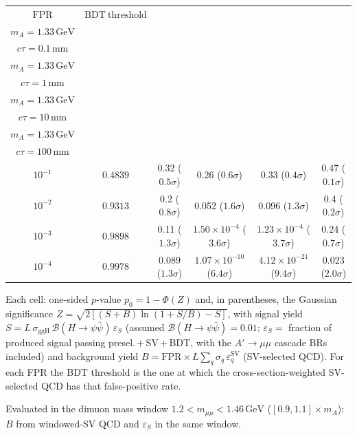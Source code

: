 \documentclass[10pt,a4paper]{article}
\begin{document}
{\begin{tabular}{cccccc}
\toprule
$\mathrm{FPR}$ & $\mathrm{BDT\ threshold}$ & \shortstack{$m_{\pi}=4\,\mathrm{GeV}$\\$m_{A}=1.33\,\mathrm{GeV}$\\$c\tau=0.1\,\mathrm{mm}$} & \shortstack{$m_{\pi}=4\,\mathrm{GeV}$\\$m_{A}=1.33\,\mathrm{GeV}$\\$c\tau=1\,\mathrm{mm}$} & \shortstack{$m_{\pi}=4\,\mathrm{GeV}$\\$m_{A}=1.33\,\mathrm{GeV}$\\$c\tau=10\,\mathrm{mm}$} & \shortstack{$m_{\pi}=4\,\mathrm{GeV}$\\$m_{A}=1.33\,\mathrm{GeV}$\\$c\tau=100\,\mathrm{mm}$} \\
\midrule
$10^{-1}$ & $0.4839$ & 0.32 ($0.5\sigma$) & 0.26 ($0.6\sigma$) & 0.33 ($0.4\sigma$) & 0.47 ($0.1\sigma$)\\
$10^{-2}$ & $0.9313$ & 0.2 ($0.8\sigma$) & 0.052 ($1.6\sigma$) & 0.096 ($1.3\sigma$) & 0.4 ($0.2\sigma$)\\
$10^{-3}$ & $0.9898$ & 0.11 ($1.3\sigma$) & $1.50\times10^{-4}$ ($3.6\sigma$) & $1.23\times10^{-4}$ ($3.7\sigma$) & 0.24 ($0.7\sigma$)\\
$10^{-4}$ & $0.9978$ & 0.089 ($1.3\sigma$) & $1.07\times10^{-10}$ ($6.4\sigma$) & $4.12\times10^{-21}$ ($9.4\sigma$) & 0.023 ($2.0\sigma$)\\
\bottomrule
\end{tabular}

{\small Each cell: one-sided $p$-value $p_0=1-\Phi(Z)$ and, in parentheses, the Gaussian significance $Z=\sqrt{2\left[(S{+}B)\ln(1{+}S/B)-S\right]}$, with signal yield $S=L\,\sigma_{\mathrm{ggH}}\,\mathcal{B}(H\to\psi\bar{\psi})\,\varepsilon_S$ (assumed $\mathcal{B}(H\to\psi\bar{\psi})=0.01$; $\varepsilon_S=$ fraction of produced signal passing presel.\,$+$\,SV\,$+$\,BDT, with the $A'\to\mu\mu$ cascade BRs included) and background yield $B=\mathrm{FPR}\times L\sum_q\sigma_q\,\varepsilon_q^{\mathrm{SV}}$ (SV-selected QCD). For each FPR the BDT threshold is the one at which the cross-section-weighted SV-selected QCD has that false-positive rate.}

{\small Evaluated in the dimuon mass window $1.2<m_{\mu\mu}<1.46\,\mathrm{GeV}$ ($[0.9,1.1]\times m_A$): $B$ from windowed-SV QCD and $\varepsilon_S$ in the same window.}

}\clearpage
\end{document}
